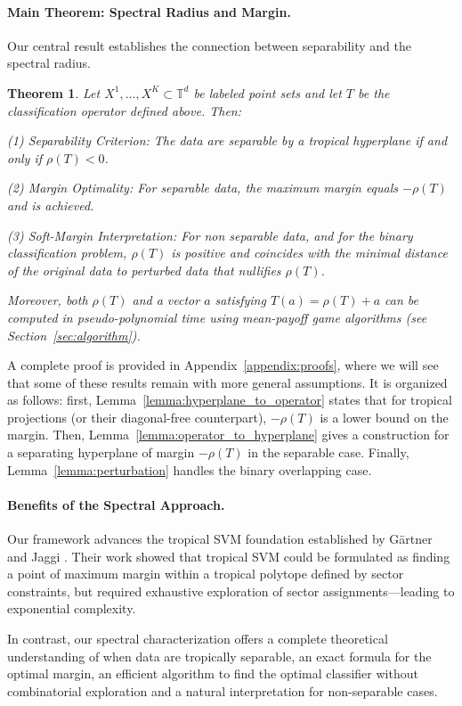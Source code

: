 \documentclass{article}
\newtheorem{theorem}{Theorem}
\newcommand{\trop}{\mathbb{T}}
\begin{document}
\paragraph{Main Theorem: Spectral Radius and Margin.}
Our central result establishes the connection between separability and the spectral radius. 
\begin{theorem}\label{thm:spectral_separability}
Let $X^1,\ldots,X^K \subset \trop^d$ be labeled point sets and let $T$ be the classification operator defined above. Then:

(1) \textit{Separability Criterion:} The data are separable by a tropical hyperplane if and only if $\rho(T) < 0$.

(2) \textit{Margin Optimality:} For separable data, the maximum margin equals $-\rho(T)$ and is achieved.

(3) \textit{Soft-Margin Interpretation:} For non separable data, and for the binary classification problem, $\rho(T)$ is positive and coincides with the minimal distance of the original data to perturbed data that nullifies $\rho(T)$.

Moreover, both $\rho(T)$ and a vector $a$ satisfying $T(a) = \rho(T)+a$ can be computed in pseudo-polynomial time using mean-payoff game algorithms (see Section~\ref{sec:algorithm}).
\end{theorem}
A complete proof is provided in Appendix~\ref{appendix:proofs}, where we will see that some of these results remain with more general assumptions.
It is organized as follows: first, Lemma~\ref{lemma:hyperplane_to_operator} states that for tropical projections (or their diagonal-free counterpart), $-\rho(T)$ is a lower bound on the margin.
Then, Lemma~\ref{lemma:operator_to_hyperplane} gives a construction for a separating hyperplane of margin $-\rho(T)$ in the separable case. Finally, Lemma~\ref{lemma:perturbation} handles the binary overlapping case.

\paragraph{Benefits of the Spectral Approach.} 
Our framework advances the tropical SVM foundation established by Gärtner and Jaggi \cite{gartner2008}. Their work showed that tropical SVM could be formulated as finding a point of maximum margin within a tropical polytope defined by sector constraints, but required exhaustive exploration of sector assignments—leading to exponential complexity.

In contrast, our spectral characterization offers a complete theoretical understanding of when data are tropically separable, an exact formula for the optimal margin, an efficient algorithm to find the optimal classifier without combinatorial exploration and a natural interpretation for non-separable cases.
\end{document}
